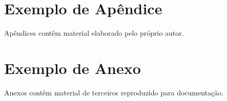 \documentclass[ppgc,diss,english]{infufrgs}
\begin{document}
\appendix

\chapter{Exemplo de Apêndice}

Apêndices contêm material elaborado pelo próprio autor.

\annex

\chapter{Exemplo de Anexo}

Anexos contêm material de terceiros reproduzido para documentação.




\end{document}
